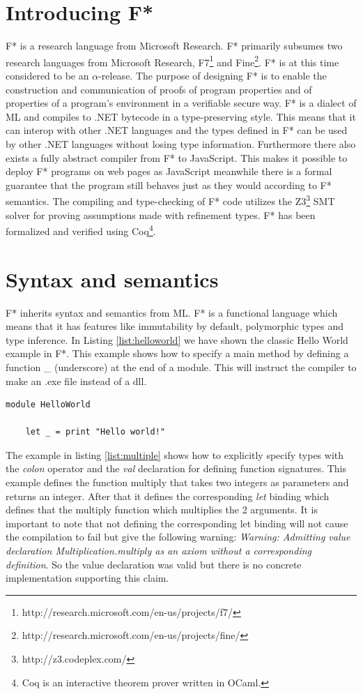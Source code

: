 \documentclass[twosided]{report}
\begin{document}
\section{Introducing F*}
F* is a research language from Microsoft Research. F* primarily subsumes two research languages from Microsoft Research, F7\footnote{http://research.microsoft.com/en-us/projects/f7/} and Fine\footnote{http://research.microsoft.com/en-us/projects/fine/}. F* is at this time considered to be an $\alpha$-release. The purpose of designing F* is to enable the construction and communication of proofs of program properties and of properties of a program's environment in a verifiable secure way. F* is a dialect of ML and compiles to .NET bytecode in a type-preserving style. This means that it can interop with other .NET languages and the types defined in F* can be used by other .NET languages without losing type information. Furthermore there also exists a fully abstract compiler from F* to JavaScript. This makes it possible to deploy F* programs on web pages as JavaScript meanwhile there is a formal guarantee that the program still behaves just as they would according to F* semantics. The compiling and type-checking of F* code utilizes the Z3\footnote{http://z3.codeplex.com/} SMT solver for proving assumptions made with refinement types. F* has been formalized and verified using Coq\footnote{Coq is an interactive theorem prover written in OCaml.}.

\section{Syntax and semantics}
F* inherits syntax and semantics from ML. F* is a functional language which means that it has features like immutability by default, polymorphic types and type inference. In Listing \ref{list:helloworld} we have shown the classic Hello World example in F*. This example shows how to specify a main method by defining a function \_ (underscore) at the end of a module. This will instruct the compiler to make an .exe file instead of a dll.

\begin{lstlisting}[style=fstar, caption={Hello World example in F*}, label={list:helloworld}]
	module HelloWorld
	
	let _ = print "Hello world!"
\end{lstlisting}

The example in listing \ref{list:multiple} shows how to explicitly specify types with the \emph{colon} operator and the \emph{val} declaration for defining function signatures. This example defines the function multiply that takes two integers as parameters and returns an integer. After that it defines the corresponding \emph{let} binding which defines that the multiply function which multiplies the 2 arguments. It is important to note that not defining the corresponding let binding will not cause the compilation to fail but give the following warning: \emph{Warning: Admitting value declaration Multiplication.multiply as an axiom without a corresponding definition}. So the value declaration was valid but there is no concrete implementation supporting this claim.
\end{document}
